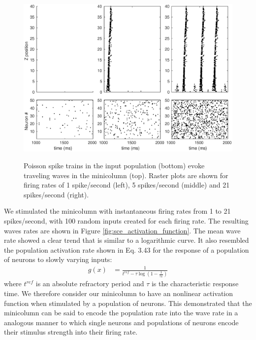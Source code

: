 \begin{figure}[!htb]
 \centering
 \caption{Poisson spike trains in the input population (bottom) evoke traveling waves in the minicolumn (top). 
	  Raster plots are shown for firing rates of 1 spike/second (left), 5 spikes/second (middle) and 21 spikes/second (right).  }
 \includegraphics[width=\textwidth]{fig/SCE_2x2_FRE_rasters}
 \label{fig:sce_raster}
\end{figure}

\FloatBarrier

We stimulated the minicolumn with instantaneous firing rates from 1 to 21 spikes/second, with 100 random inputs created for each firing rate.
The resulting waves rates are shown in Figure \ref{fig:sce_activation_function}.
The mean wave rate showed a clear trend that is similar to a logarithmic curve. 
It also resembled the population activation rate shown in \citet{Trappenberg2010} Eq. 3.43 for the response of a population of neurons to slowly varying inputs:
\begin{align}
 g(x) &= \frac{1}{t^{ref}-\tau \log{(1-\frac{1}{\tau x})}}
\end{align}
where $t^{ref}$ is an absolute refractory period and $\tau$ is the characteristic response time.
We therefore consider our minicolumn to have an nonlinear activation function when stimulated by a  population of neurons.
This demonstrated that the minicolumn can be said to encode the population rate into the wave rate in a analogous manner to which single neurons and populations of neurons 
encode their stimulus strength into their firing rate.

